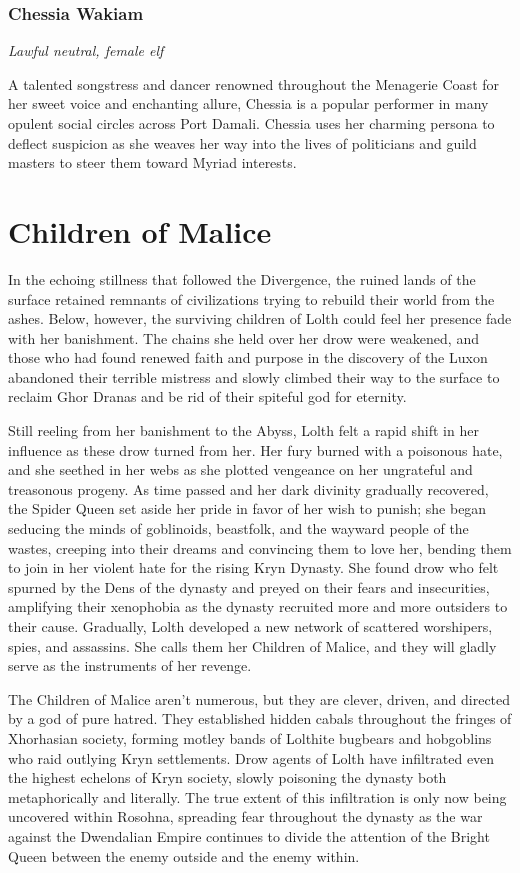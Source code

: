 \documentclass[10pt,a4paper,twoside,bg=print,twocolumn,openany,nodeprecatedcode]{dndbook}
\begin{document}
\subsubsection{Chessia Wakiam}
\textit{Lawful neutral, female elf}

A talented songstress and dancer renowned throughout the Menagerie Coast for her sweet voice and enchanting allure, Chessia is a popular performer in many opulent social circles across Port Damali. Chessia uses her charming persona to deflect suspicion as she weaves her way into the lives of politicians and guild masters to steer them toward Myriad interests.

\section{Children of Malice}
In the echoing stillness that followed the Divergence, the ruined lands of the surface retained remnants of civilizations trying to rebuild their world from the ashes. Below, however, the surviving children of Lolth could feel her presence fade with her banishment. The chains she held over her drow were weakened, and those who had found renewed faith and purpose in the discovery of the Luxon abandoned their terrible mistress and slowly climbed their way to the surface to reclaim Ghor Dranas and be rid of their spiteful god for eternity.

Still reeling from her banishment to the Abyss, Lolth felt a rapid shift in her influence as these drow turned from her. Her fury burned with a poisonous hate, and she seethed in her webs as she plotted vengeance on her ungrateful and treasonous progeny. As time passed and her dark divinity gradually recovered, the Spider Queen set aside her pride in favor of her wish to punish; she began seducing the minds of goblinoids, beastfolk, and the wayward people of the wastes, creeping into their dreams and convincing them to love her, bending them to join in her violent hate for the rising Kryn Dynasty. She found drow who felt spurned by the Dens of the dynasty and preyed on their fears and insecurities, amplifying their xenophobia as the dynasty recruited more and more outsiders to their cause. Gradually, Lolth developed a new network of scattered worshipers, spies, and assassins. She calls them her Children of Malice, and they will gladly serve as the instruments of her revenge.

The Children of Malice aren't numerous, but they are clever, driven, and directed by a god of pure hatred. They established hidden cabals throughout the fringes of Xhorhasian society, forming motley bands of Lolthite bugbears and hobgoblins who raid outlying Kryn settlements. Drow agents of Lolth have infiltrated even the highest echelons of Kryn society, slowly poisoning the dynasty both metaphorically and literally. The true extent of this infiltration is only now being uncovered within Rosohna, spreading fear throughout the dynasty as the war against the Dwendalian Empire continues to divide the attention of the Bright Queen between the enemy outside and the enemy within.
\end{document}

